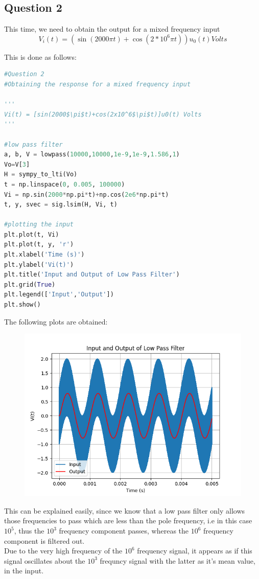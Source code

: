 \documentclass[11pt, a4paper]{article}
\begin{document}
\subsection{Question 2}
This time, we need to obtain the output for a mixed frequency input 
\[V_i(t) = (\sin(2000\pi t)+\cos(2*10^6\pi t))u_0(t) Volts\]

This is done as follows:\\
\begin{lstlisting}[language = Python]
#Question 2
#Obtaining the response for a mixed frequency input 

'''
Vi(t) = [sin(2000$\pi$t)+cos(2x10^6$\pi$t)]u0(t) Volts
'''

#low pass filter
a, b, V = lowpass(10000,10000,1e-9,1e-9,1.586,1)
Vo=V[3]
H = sympy_to_lti(Vo)
t = np.linspace(0, 0.005, 100000)
Vi = np.sin(2000*np.pi*t)+np.cos(2e6*np.pi*t)
t, y, svec = sig.lsim(H, Vi, t)

#plotting the input
plt.plot(t, Vi)
plt.plot(t, y, 'r')
plt.xlabel('Time (s)')
plt.ylabel('Vi(t)')
plt.title('Input and Output of Low Pass Filter')
plt.grid(True)
plt.legend(['Input','Output'])
plt.show()
\end{lstlisting}

The following plots are obtained:
\begin{figure}[H]
     \centering
     \includegraphics[scale=0.8]{Figure_5.png}
\end{figure}

This can be explained easily, since we know that a low pass filter only allows those frequencies to pass which are less than the pole frequency, i.e in this case $10^5$, thus the $10^3$ frequency component passes, whereas the $10^6$ frequency component is filtered out. \\Due to the very high frequency of the $10^6$ frequency signal, it appears as if this signal oscillates about the $10^3$ frequncy signal with the latter as it's mean value, in the input.
\end{document}
